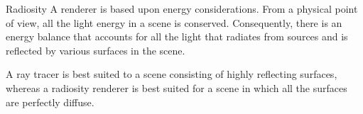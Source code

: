 \documentclass[../COS3712_Notes.tex]{subfiles}
\begin{document}
      \begin{definition}{Radiosity}
        A  renderer is based upon energy considerations.
        From a physical point of view, all the light energy in a scene is conserved.
        Consequently, there is an energy balance that accounts for all the light
        that radiates from sources and is reflected by various surfaces in the scene.
      \end{definition}

      A ray tracer is best suited to a scene consisting of highly reflecting surfaces,
      whereas a radiosity renderer is best suited for a scene in which all the surfaces
      are perfectly diffuse.

\end{document}
